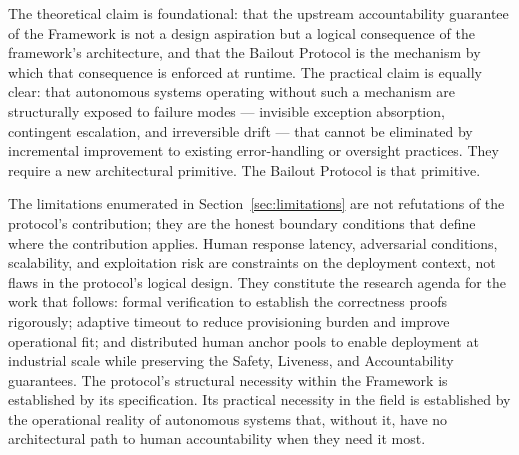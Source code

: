 The theoretical claim is foundational: that the upstream accountability guarantee of the \bxthree{} Framework is not a design aspiration but a logical consequence of the framework's architecture, and that the Bailout Protocol is the mechanism by which that consequence is enforced at runtime. The practical claim is equally clear: that autonomous systems operating without such a mechanism are structurally exposed to failure modes --- invisible exception absorption, contingent escalation, and irreversible drift --- that cannot be eliminated by incremental improvement to existing error-handling or oversight practices. They require a new architectural primitive. The Bailout Protocol is that primitive.

The limitations enumerated in Section~\ref{sec:limitations} are not refutations of the protocol's contribution; they are the honest boundary conditions that define where the contribution applies. Human response latency, adversarial conditions, scalability, and exploitation risk are constraints on the deployment context, not flaws in the protocol's logical design. They constitute the research agenda for the work that follows: formal verification to establish the correctness proofs rigorously; adaptive timeout to reduce provisioning burden and improve operational fit; and distributed human anchor pools to enable deployment at industrial scale while preserving the Safety, Liveness, and Accountability guarantees. The protocol's structural necessity within the \bxthree{} Framework is established by its specification. Its practical necessity in the field is established by the operational reality of autonomous systems that, without it, have no architectural path to human accountability when they need it most.